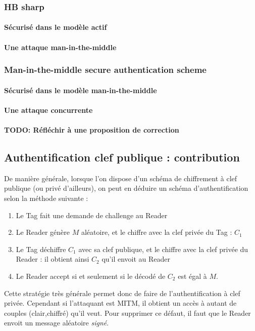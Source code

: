 \documentclass{article}		%
\theoremstyle{definition}
\theoremstyle{plain}
\theoremstyle{plain}
\theoremstyle{plain}
\theoremstyle{plain}
\begin{document}
\subsubsection{HB sharp}
\paragraph{Sécurisé dans le modèle actif}
\paragraph{Une attaque man-in-the-middle}
\subsubsection{Man-in-the-middle secure authentication scheme}
\paragraph{Sécurisé dans le modèle man-in-the-middle}
\paragraph{Une attaque concurrente}
\paragraph{TODO: Réfléchir à une proposition de correction}

\subsection{Authentification clef publique : contribution}
De manière générale, lorsque l'on dispose d'un schéma de chiffrement à
clef publique (ou privé d'ailleurs), on peut en déduire un schéma
d'authentification selon la méthode suivante :
\begin{enumerate}
\item Le Tag fait une demande de challenge au Reader
\item Le Reader génère $M$ aléatoire, et le chiffre avec la clef privée du
Tag : $C_1$
\item Le Tag déchiffre $C_1$ avec sa clef publique, et le chiffre avec la
clef privée du Reader : il obtient ainsi $C_2$ qu'il envoit au Reader
\item Le Reader accept si et seulement si le décodé de $C_2$ est égal à
$M$.
\end{enumerate}

Cette stratégie très générale permet donc de faire de l'authentification
à clef privée. Cependant si l'attaquant est MITM, il obtient un accès à
autant de couples (clair,chiffré) qu'il veut. Pour supprimer ce défaut,
il faut que le Reader envoit un message aléatoire \emph{signé}.
\end{document}
